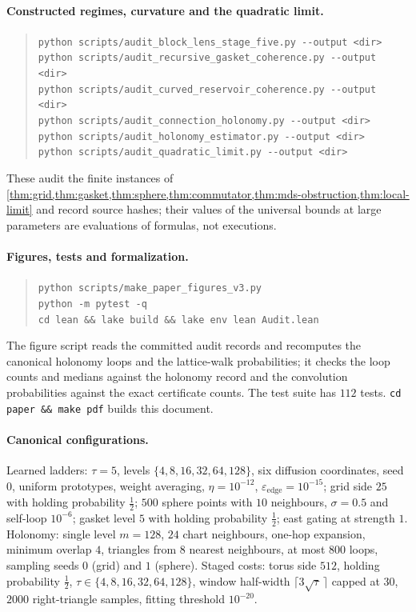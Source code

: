 \documentclass[11pt]{article}
\begin{document}
\paragraph{Constructed regimes, curvature and the quadratic limit.}
\begin{quote}\small
\texttt{python scripts/audit\_block\_lens\_stage\_five.py -{}-output <dir>}\\
\texttt{python scripts/audit\_recursive\_gasket\_coherence.py -{}-output <dir>}\\
\texttt{python scripts/audit\_curved\_reservoir\_coherence.py -{}-output <dir>}\\
\texttt{python scripts/audit\_connection\_holonomy.py -{}-output <dir>}\\
\texttt{python scripts/audit\_holonomy\_estimator.py -{}-output <dir>}\\
\texttt{python scripts/audit\_quadratic\_limit.py -{}-output <dir>}
\end{quote}
These audit the finite instances of \cref{thm:grid,thm:gasket,thm:sphere,thm:commutator,thm:mds-obstruction,thm:local-limit} and record source hashes; their values of the universal bounds at large parameters are evaluations of formulas, not executions.

\paragraph{Figures, tests and formalization.}
\begin{quote}\small
\texttt{python scripts/make\_paper\_figures\_v3.py}\\
\texttt{python -m pytest -q}\\
\texttt{cd lean \&\& lake build \&\& lake env lean Audit.lean}
\end{quote}
The figure script reads the committed audit records and recomputes the canonical holonomy loops and the lattice-walk probabilities; it checks the loop counts and medians against the holonomy record and the convolution probabilities against the exact certificate counts.
The test suite has $112$ tests.
\texttt{cd paper \&\& make pdf} builds this document.

\paragraph{Canonical configurations.}
Learned ladders: $\tau=5$, levels $\{4,8,16,32,64,128\}$, six diffusion coordinates, seed $0$, uniform prototypes, weight averaging, $\eta=10^{-12}$, $\varepsilon_{\mathrm{edge}}=10^{-15}$; grid side $25$ with holding probability $\tfrac12$; $500$ sphere points with $10$ neighbours, $\sigma=0.5$ and self-loop $10^{-6}$; gasket level $5$ with holding probability $\tfrac12$; east gating at strength $1$.
Holonomy: single level $m=128$, $24$ chart neighbours, one-hop expansion, minimum overlap $4$, triangles from $8$ nearest neighbours, at most $800$ loops, sampling seeds $0$ (grid) and $1$ (sphere).
Staged costs: torus side $512$, holding probability $\tfrac12$, $\tau\in\{4,8,16,32,64,128\}$, window half-width $\lceil3\sqrt\tau\,\rceil$ capped at $30$, $2000$ right-triangle samples, fitting threshold $10^{-20}$.
\end{document}
